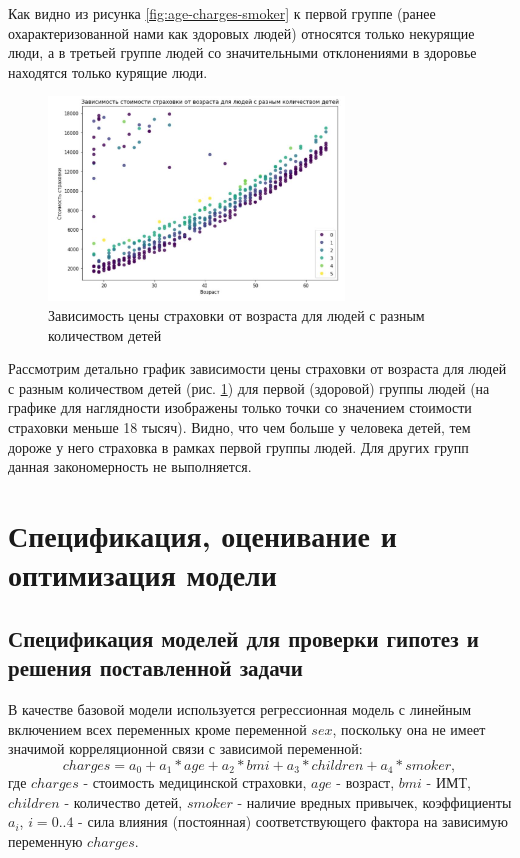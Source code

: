\documentclass[a4paper,12pt]{article}
\begin{document}
Как видно из рисунка \ref{fig:age-charges-smoker} к первой группе (ранее охарактеризованной нами как здоровых людей) относятся только некурящие люди, а в третьей группе людей со значительными отклонениями в здоровье находятся только курящие люди.

\begin{figure}[H]
	\includegraphics[width=0.7\textwidth]{../[graphics]/age-charges-childern.jpg}
	\centering
	\caption{Зависимость цены страховки от возраста для людей с разным количеством детей}
	\label{fig:age-charges-children}
\end{figure}

Рассмотрим детально график зависимости цены страховки от возраста для людей с разным количеством детей (рис. \ref{fig:age-charges-children}) для первой (здоровой) группы людей (на графике для наглядности изображены только точки со значением стоимости страховки меньше 18 тысяч). Видно, что чем больше у человека детей, тем дороже у него страховка в рамках первой группы людей. Для других групп данная закономерность не выполняется.

\section{Спецификация, оценивание и оптимизация модели}

\subsection{Спецификация моделей для проверки гипотез и решения поставленной задачи}

В качестве базовой модели используется регрессионная модель с линейным включением всех переменных кроме переменной $sex$, поскольку она не имеет значимой корреляционной связи с зависимой переменной:
\[charges = a_0 + a_1 * age + a_2 * bmi + a_3 * children + a_4 * smoker,\]	
где $charges$ - стоимость медицинской страховки,
$age$ - возраст,
$bmi$ - ИМТ,
$children$ - количество детей,
$smoker$ - наличие вредных привычек, коэффициенты $a_i$, $i=0..4$ - сила влияния (постоянная) соответствующего фактора на зависимую переменную $charges$.
\end{document}
